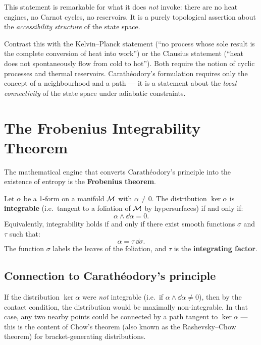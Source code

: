 This statement is remarkable for what it does \emph{not} invoke: there are no heat engines, no Carnot cycles, no reservoirs. It is a purely topological assertion about the \emph{accessibility structure} of the state space.

\begin{remark}
Contrast this with the Kelvin--Planck statement (``no process whose sole result is the complete conversion of heat into work'') or the Clausius statement (``heat does not spontaneously flow from cold to hot''). Both require the notion of cyclic processes and thermal reservoirs. Carath\'eodory's formulation requires only the concept of a neighbourhood and a path --- it is a statement about the \emph{local connectivity} of the state space under adiabatic constraints.
\end{remark}

\section{The Frobenius Integrability Theorem}

The mathematical engine that converts Carath\'eodory's principle into the existence of entropy is the \textbf{Frobenius theorem}.

\begin{theorem}
Let $\alpha$ be a 1-form on a manifold $\mathcal{M}$ with $\alpha \neq 0$. The distribution $\ker\alpha$ is \textbf{integrable} (i.e.\ tangent to a foliation of $\mathcal{M}$ by hypersurfaces) if and only if:
\begin{equation}
\alpha \wedge \dd\alpha = 0.
\end{equation}
Equivalently, integrability holds if and only if there exist smooth functions $\sigma$ and $\tau$ such that:
\begin{equation}
\alpha = \tau\,\dd\sigma.
\end{equation}
The function $\sigma$ labels the leaves of the foliation, and $\tau$ is the \textbf{integrating factor}.
\end{theorem}

\subsection{Connection to Carath\'eodory's principle}

If the distribution $\ker\alpha$ were \emph{not} integrable (i.e.\ if $\alpha \wedge \dd\alpha \neq 0$), then by the contact condition, the distribution would be maximally non-integrable. In that case, any two nearby points could be connected by a path tangent to $\ker\alpha$ --- this is the content of Chow's theorem (also known as the Rashevsky--Chow theorem) for bracket-generating distributions.

